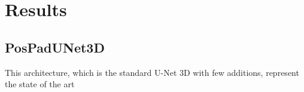 
\chapter{Results}

\label{chp:results}

\def\:{\hskip0pt} %

\section{PosPadUNet3D}
This architecture, which is the standard U-Net 3D with few additions, represent the state of the art 
